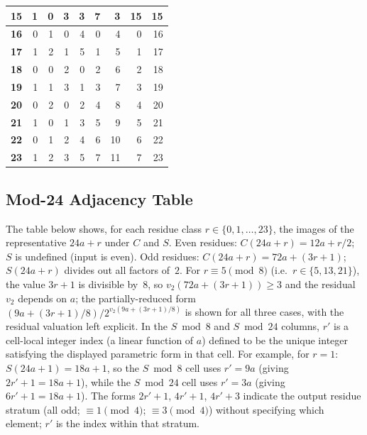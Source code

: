 \documentclass[11pt,a4paper]{article}
\theoremstyle{remark}
\theoremstyle{plain}
\begin{document}
\begin{tabular}{>{\bfseries}r|rrrrrrrr}
  \textbf{15} & \cellcolor{res1}1 & \cellcolor{res0}0 & \cellcolor{res3}3 & \cellcolor{res3}3 & \cellcolor{res7}7 & \cellcolor{res3}3 & \cellcolor{res15}15 & \cellcolor{res15}15 \\
  \hline
  \textbf{16} & 0 & 1 & 0 & 4 & 0 & 4 & 0 & 16 \\
  \textbf{17} & \cellcolor{res1}1 & \cellcolor{res2}2 & \cellcolor{res1}1 & \cellcolor{res5}5 & \cellcolor{res1}1 & \cellcolor{res5}5 & \cellcolor{res1}1 & \cellcolor{res17}17 \\
  \hline
  \textbf{18} & 0 & 0 & 2 & 0 & 2 & 6 & 2 & 18 \\
  \textbf{19} & \cellcolor{res1}1 & \cellcolor{res1}1 & \cellcolor{res3}3 & \cellcolor{res1}1 & \cellcolor{res3}3 & \cellcolor{res7}7 & \cellcolor{res3}3 & \cellcolor{res19}19 \\
  \hline
  \textbf{20} & 0 & 2 & 0 & 2 & 4 & 8 & 4 & 20 \\
  \textbf{21} & \cellcolor{res1}1 & \cellcolor{res0}0 & \cellcolor{res1}1 & \cellcolor{res3}3 & \cellcolor{res5}5 & \cellcolor{res9}9 & \cellcolor{res5}5 & \cellcolor{res21}21 \\
  \hline
  \textbf{22} & 0 & 1 & 2 & 4 & 6 & 10 & 6 & 22 \\
  \textbf{23} & \cellcolor{res1}1 & \cellcolor{res2}2 & \cellcolor{res3}3 & \cellcolor{res5}5 & \cellcolor{res7}7 & \cellcolor{res11}11 & \cellcolor{res7}7 & \cellcolor{res23}23 \\
\bottomrule
\end{tabular}

\subsection{Mod-24 Adjacency Table}
\label{sec:adjacency}

The table below shows, for each residue class $r \in \{0,1,\ldots,23\}$, the images
of the representative $24a+r$ under $C$ and $S$.
Even residues: $C(24a+r) = 12a + r/2$; $S$ is undefined (input is even).
Odd residues: $C(24a+r) = 72a + (3r+1)$; $S(24a+r)$ divides out all factors of~$2$.
For $r \equiv 5 \pmod{8}$ (i.e.\ $r \in \{5, 13, 21\}$), the value $3r+1$ is divisible
by~$8$, so $v_2(72a + (3r+1)) \geq 3$ and the residual $v_2$ depends on $a$;
the partially-reduced form $(9a + (3r+1)/8) / 2^{v_2(9a+(3r+1)/8)}$ is shown
for all three cases, with the residual valuation left explicit.
In the $S \bmod 8$ and $S \bmod 24$ columns, $r'$ is a cell-local integer index
(a linear function of $a$) defined to be the unique integer satisfying the
displayed parametric form in that cell. For example, for $r=1$:
$S(24a+1) = 18a+1$, so the $S \bmod 8$ cell uses $r' = 9a$ (giving $2r'+1 = 18a+1$),
while the $S \bmod 24$ cell uses $r' = 3a$ (giving $6r'+1 = 18a+1$).
The forms $2r'+1$, $4r'+1$, $4r'+3$ indicate the output residue stratum
(all odd; $\equiv 1\pmod 4$; $\equiv 3\pmod 4$) without specifying which
element; $r'$ is the index within that stratum.
\end{document}
